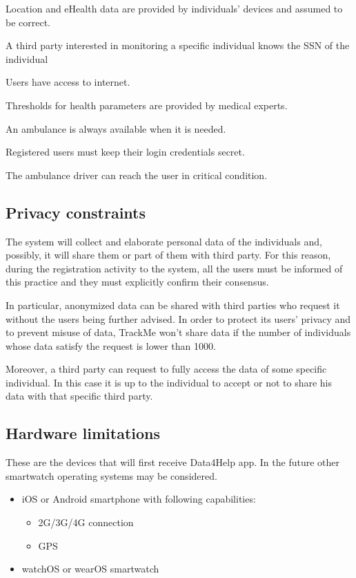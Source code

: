 \begin{dom}
Location and eHealth data are provided by individuals' devices and assumed to be correct.
\end{dom}
\begin{dom}
A third party interested in monitoring a specific individual knows the SSN of the individual
\end{dom}
\begin{dom}
Users have access to internet.
\end{dom}
\begin{dom}
Thresholds for health parameters are provided by medical experts.
\end{dom}
\begin{dom}
An ambulance is always available when it is needed.
\end{dom}
\begin{dom}
Registered users must keep their login credentials secret.
\end{dom}
\begin{dom}
The ambulance driver can reach the user in critical condition.
\end{dom}



\subsection{Privacy constraints}
The system will collect and elaborate personal data of the individuals and, possibly, it will share them or part of them with third party.  For this reason, during the registration activity to the system, all the users must be informed of this practice and they must explicitly confirm their consensus.

In particular, anonymized data can be shared with third parties who request it without the users being further advised. In order to protect its users' privacy and to prevent misuse of data, TrackMe won't share data if the number of individuals whose data satisfy the request is lower than 1000.

Moreover, a third party can request to fully access the data of some specific individual. In this case it is up to the individual to accept or not to share his data with that specific third party.

\subsection{Hardware limitations}
These are the devices that will first receive Data4Help app. 
In the future other smartwatch operating systems may be considered.
\begin{itemize}
\item iOS or Android smartphone with following capabilities:
\begin{itemize}
\item 2G/3G/4G connection
\item GPS
\end{itemize}
\item watchOS or wearOS smartwatch
\end{itemize}

